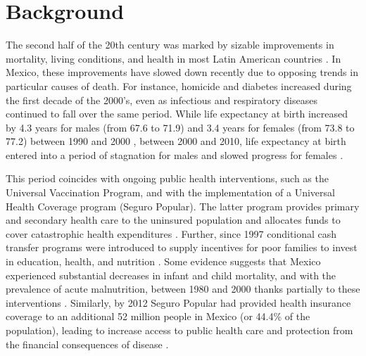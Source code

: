 \documentclass{bmcart}
\begin{document}



\section*{Background}
The second half of the 20th century was marked by sizable improvements in mortality, living
conditions, and health in most Latin American countries \cite{who2000}. 
In Mexico, these improvements have slowed down recently due to opposing
trends in particular causes of death. For instance, homicide and diabetes
increased during the first decade of the 2000's, even as infectious and
respiratory diseases continued to fall over the same period. While life
expectancy at birth increased by 4.3 years for males (from 67.6 to 71.9) and 3.4 years
for females (from 73.8 to 77.2) between 1990 and 2000 \cite{SOMEDE},
between 2000 and 2010, life expectancy at birth entered into a period of
stagnation for males and slowed progress for females \cite{canudas2014}. 

This
period coincides with ongoing public health interventions, such as the Universal Vaccination Program, and with the implementation of a Universal Health Coverage program (Seguro
Popular). The latter program provides primary and secondary
health care to the uninsured population and allocates funds to cover catastrophic
health expenditures \cite{knaul2005}. Further, since 1997 conditional cash transfer programs were introduced to supply incentives for poor families to invest in education, health, and nutrition \cite{neufeld2012}. Some evidence
suggests that Mexico experienced substantial decreases in infant and child
mortality, and with the prevalence of acute malnutrition, between 1980 and 2000
thanks partially to these interventions \cite{sepulveda2006}. Similarly, by 2012 Seguro Popular had provided health insurance coverage to an additional 52 million
people in Mexico (or 44.4\% of the population), leading to increase access to public health care and protection from the financial consequences of disease \cite{knaul2012}.
\end{document}
